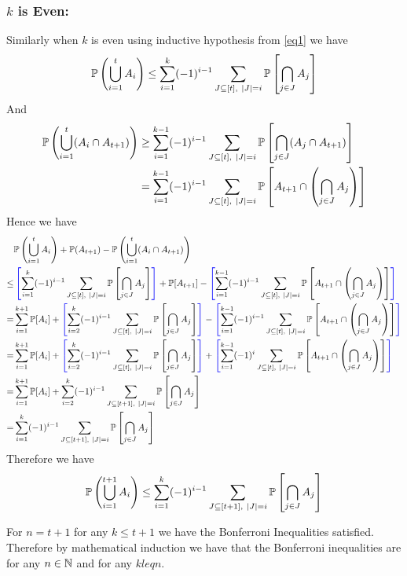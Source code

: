 \documentclass[a4paper, 11pt]{article}
\begin{document}
{\begin{enumerate}[label=(\alph*)]
\subsubsection*{$k$ is Even:}
Similarly when $k$ is even using inductive hypothesis from \eqref{eq1} we have  $$\bbP\left(\bigcup_{i=1}^t A_i\right)
\leq \sum\limits_{i=1}^k(-1)^{i-1}\sum\limits_{J\subseteq [t],\ |J|=i}\bbP\lt[\bigcap\limits_{j\in J}A_j\rt] $$And \begin{align*}
	\bbP\left(\bigcup_{i=1}^t (A_i\cap A_{t+1})\right)& \geq  \sum\limits_{i=1}^{k-1}(-1)^{i-1}\sum\limits_{J\subseteq [t],\ |J|=i}\bbP\lt[ \bigcap_{j\in J}(A_j\cap A_{t+1}) \rt]\\
	& = \sum_{i=1}^{k-1}(-1)^{i-1}\sum_{J\subseteq [t],\ |J|=i}\bbP\lt[ A_{t+1}\cap\lt( \bigcap_{j\in J}A_j \rt)\rt]
\end{align*}Hence we have \begin{align*}
&\bbP\left(\bigcup_{i=1}^t A_i\right)+\bbP(A_{t+1})-\bbP\left(\bigcup_{i=1}^t (A_i\cap A_{t+1})\right)\\
\leq &  \mathcolor{blue}{\left[}\sum\limits_{i=1}^k(-1)^{i-1}\sum\limits_{J\subseteq [t],\ |J|=i}\bbP\lt[\bigcap\limits_{j\in J}A_j\rt]\mathcolor{blue}{\right]}+\bbP[A_{t+1}]-\mathcolor{blue}{\left[}\sum_{i=1}^{k-1}(-1)^{i-1}\sum_{J\subseteq [t],\ |J|=i}\bbP\lt[ A_{t+1}\cap\lt( \bigcap_{j\in J}A_j \rt)\rt]\mathcolor{blue}{\right]}\\
= & \sum_{i=1}^{k+1}\bbP[A_i]+ \mathcolor{blue}{\left[}\sum\limits_{i=2}^k(-1)^{i-1}\sum\limits_{J\subseteq [t],\ |J|=i}\bbP\lt[\bigcap\limits_{j\in J}A_j\rt]\mathcolor{blue}{\right]}-\mathcolor{blue}{\left[}\sum_{i=1}^{k-1}(-1)^{i-1}\sum_{J\subseteq [t],\ |J|=i}\bbP\lt[ A_{t+1}\cap\lt( \bigcap_{j\in J}A_j \rt)\rt]\mathcolor{blue}{\right]}\\
= & \sum_{i=1}^{k+1}\bbP[A_i]+ \mathcolor{blue}{\left[}\sum\limits_{i=2}^k(-1)^{i-1}\sum\limits_{J\subseteq [t],\ |J|=i}\bbP\lt[\bigcap\limits_{j\in J}A_j\rt]\mathcolor{blue}{\right]}+\mathcolor{blue}{\left[}\sum_{i=1}^{k-1}(-1)^{i}\sum_{J\subseteq [t],\ |J|=i}\bbP\lt[ A_{t+1}\cap\lt( \bigcap_{j\in J}A_j \rt)\rt]\mathcolor{blue}{\right]}\\
= &  \sum_{i=1}^{k+1}\bbP[A_i]+ \sum\limits_{i=2}^k(-1)^{i-1}\sum\limits_{J\subseteq [t+1],\ |J|=i}\bbP\lt[\bigcap\limits_{j\in J}A_j\rt]\\
= & \sum\limits_{i=1}^k(-1)^{i-1}\sum\limits_{J\subseteq [t+1],\ |J|=i}\bbP\lt[\bigcap\limits_{j\in J}A_j\rt]
\end{align*}Therefore we have $$\mathbb{P}\left(\bigcup_{i=1}^{t+1}A_i\right)\leq  \sum\limits_{i=1}^k(-1)^{i-1}\sum\limits_{J\subseteq [t+1],\ |J|=i}\mathbb{P}\left[\bigcap\limits_{j\in J}A_j\right]$$

For $n=t+1$ for any $k\leq t+1$ we have the Bonferroni Inequalities satisfied. Therefore by mathematical induction we have that the Bonferroni inequalities are for any $n\in \mathbb{N}$ and for any $kleq n$.
		\end{enumerate}
}
\end{document}
